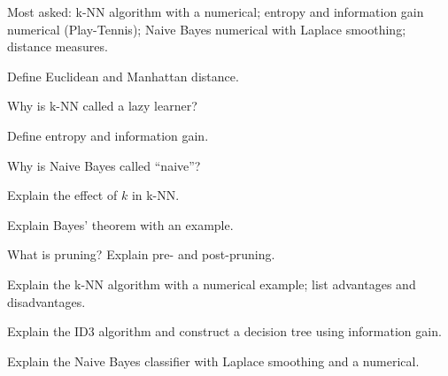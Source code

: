 \begin{imp}
Most asked: k-NN algorithm with a numerical; entropy and information gain numerical (Play-Tennis); Naive Bayes numerical with Laplace smoothing; distance measures.
\end{imp}

\begin{iq}
\item \twom Define Euclidean and Manhattan distance.
\item \twom Why is k-NN called a lazy learner?
\item \twom Define entropy and information gain.
\item \twom Why is Naive Bayes called ``naive''?
\item \fivem Explain the effect of $k$ in k-NN.
\item \fivem Explain Bayes' theorem with an example.
\item \fivem What is pruning? Explain pre- and post-pruning.
\item \tenm Explain the k-NN algorithm with a numerical example; list advantages and disadvantages.
\item \tenm Explain the ID3 algorithm and construct a decision tree using information gain.
\item \tenm Explain the Naive Bayes classifier with Laplace smoothing and a numerical.
\end{iq}
